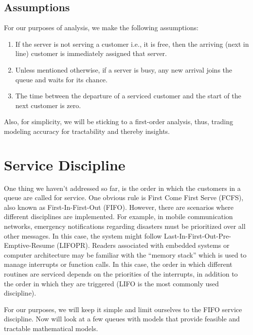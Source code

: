 \documentclass[11pt, a4paper]{report}
\begin{document}
\subsection{Assumptions}

For our purposes of analysis, we make the following assumptions:
\begin{enumerate}
    \item If the server is not serving a customer i.e., it is free, then the arriving (next in line) customer is immediately assigned that server.
    \item Unless mentioned otherwise, if a server is busy, any new arrival joins the queue and waits for its chance.
    \item The time between the departure of a serviced customer and the start of the next customer is zero.
\end{enumerate}
Also, for simplicity, we will be sticking to a first-order analysis, thus, trading modeling accuracy for tractability and thereby insights.

\section{Service Discipline}
One thing we haven't addressed so far, is the order in which the customers in a queue are called for service. 
One obvious rule is First Come First Serve (FCFS), also known as First-In-First-Out (FIFO). However, there are scenarios where different disciplines are implemented. For example, in mobile communication networks, emergency notifications regarding disasters must be prioritized over all other messages. In this case, the system might follow Last-In-First-Out-Pre-Emptive-Resume (LIFOPR). Readers associated with embedded systems or computer architecture may be familiar with the ``memory stack'' which is used to manage interrupts or function calls. In this case, the order in which different routines are serviced depends on the priorities of the interrupts, in addition to the order in which they are triggered (LIFO is the most commonly used discipline).

For our purposes, we will keep it simple and limit ourselves to the FIFO service discipline. Now will look at a few queues with models that provide feasible and tractable mathematical models.
\end{document}
